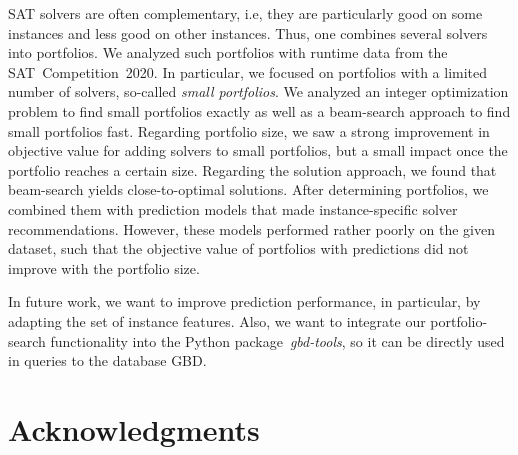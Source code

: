 \documentclass[conference]{IEEEtran}
\begin{document}
SAT solvers are often complementary, i.e, they are particularly good on some instances and less good on other instances.
Thus, one combines several solvers into portfolios.
We analyzed such portfolios with runtime data from the SAT~Competition~2020.
In particular, we focused on portfolios with a limited number of solvers, so-called \emph{small portfolios}.
We analyzed an integer optimization problem to find small portfolios exactly as well as a beam-search approach to find small portfolios fast.
Regarding portfolio size, we saw a strong improvement in objective value for adding solvers to small portfolios, but a small impact once the portfolio reaches a certain size.
Regarding the solution approach, we found that beam-search yields close-to-optimal solutions.
After determining portfolios, we combined them with prediction models that made instance-specific solver recommendations.
However, these models performed rather poorly on the given dataset, such that the objective value of portfolios with predictions did not improve with the portfolio size.

In future work, we want to improve prediction performance, in particular, by adapting the set of instance features.
Also, we want to integrate our portfolio-search functionality into the Python package~\emph{gbd-tools}, so it can be directly used in queries to the database GBD.

\section*{Acknowledgments}


\balance %



\end{document}
